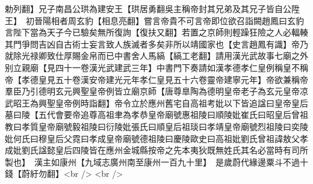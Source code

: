 勅列翻】兄子南昌公珙為建安王【珙居勇翻吳主稱帝封其兄弟及其兄子皆自公陞王】　初晉陽相者周玄豹【相息亮翻】嘗言帝貴不可言帝即位欲召詣闕趙鳳曰玄豹言陛下當為天子今已驗矣無所復詢【復扶又翻】若置之京師則輕躁狂險之人必輻輳其門爭問吉凶自古術士妄言致人族滅者多矣非所以靖國家也【史言趙鳳有識】帝乃就除光禄卿致仕厚賜金帛而已中書舍人馬縞【縞工老翻】請用漢光武故事七廟之外别立親廟【見四十一卷漢光武建武三年】中書門下奏請如漢孝德孝仁皇例稱皇不稱帝【孝德皇見五十卷漢安帝建光元年孝仁皇見五十六卷靈帝建寧元年】帝欲兼稱帝羣臣乃引德明玄元興聖皇帝例皆立廟京師【唐尊臯陶為德明皇帝老子為玄元皇帝凉武昭王為興聖皇帝例時詣翻】帝令立於應州舊宅自高祖考妣以下皆追諡曰皇帝皇后墓曰陵【五代會要帝追尊高祖聿為孝恭皇帝廟號惠祖陵曰順陵妣崔氏曰昭皇后曾祖教曰孝質皇帝廟號毅祖陵曰衍陵妣張氏曰順皇后祖琰曰孝靖皇帝廟號烈祖陵曰奕陵妣何氏曰穆皇后父霓曰孝成皇帝廟號德祖陵曰慶陵歐史曰高祖妣劉氏曾祖諱敖父孝成妣劉氏諡懿皇后四陵皆在應州金城縣按帝之先本夷狄既無姓氏其名必當時有司所製也】　漢主如康州【九域志廣州南至康州一百九十里】　是歲蔚代緣邊粟斗不過十錢【蔚紆勿翻】<br />
<br />
